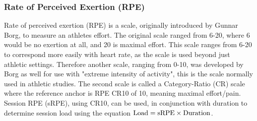 \subsubsection{Rate of Perceived Exertion (RPE)} \label{subsub:rpe}
Rate of perceived exertion (RPE) is a scale, originally introduced by Gunnar Borg, to measure an athletes effort. The original scale ranged from 6-20, where 6 would be no exertion at all, and 20 is maximal effort. This scale ranges from 6-20 to correspond more easily with heart rate, as the scale is used beyond just athletic settings. Therefore another scale, ranging from 0-10, was developed by Borg as well for use with "extreme intensity of activity", this is the scale normally used in athletic studies. The second scale is called a Category-Ratio (CR) scale where the reference anchor is RPE CR10 of 10, meaning maximal effort/pain. Session RPE (sRPE), using CR10, can be used, in conjunction with duration to determine session load \cite{Williams2017} using the equation $\textnormal{Load} = \textnormal{sRPE} \times \textnormal{Duration}$.

